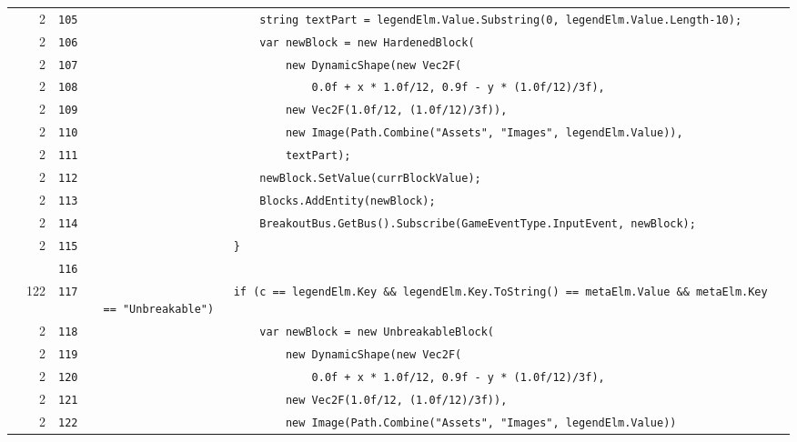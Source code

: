 \documentclass[a4paper,landscape,10pt]{article}
\begin{document}
\begin{longtable}[l]{lrrll}
\cellcolor{green} & 2 & \verb~105~ & & \verb~                        string textPart = legendElm.Value.Substring(0, legendElm.Value.Length-10);~\\
\cellcolor{green} & 2 & \verb~106~ & & \verb~                        var newBlock = new HardenedBlock(~\\
\cellcolor{green} & 2 & \verb~107~ & & \verb~                            new DynamicShape(new Vec2F(~\\
\cellcolor{green} & 2 & \verb~108~ & & \verb~                                0.0f + x * 1.0f/12, 0.9f - y * (1.0f/12)/3f),~\\
\cellcolor{green} & 2 & \verb~109~ & & \verb~                            new Vec2F(1.0f/12, (1.0f/12)/3f)),~\\
\cellcolor{green} & 2 & \verb~110~ & & \verb~                            new Image(Path.Combine("Assets", "Images", legendElm.Value)),~\\
\cellcolor{green} & 2 & \verb~111~ & & \verb~                            textPart);~\\
\cellcolor{green} & 2 & \verb~112~ & & \verb~                        newBlock.SetValue(currBlockValue);~\\
\cellcolor{green} & 2 & \verb~113~ & & \verb~                        Blocks.AddEntity(newBlock);~\\
\cellcolor{green} & 2 & \verb~114~ & & \verb~                        BreakoutBus.GetBus().Subscribe(GameEventType.InputEvent, newBlock);~\\
\cellcolor{green} & 2 & \verb~115~ & & \verb~                    }~\\
\cellcolor{gray} &  & \verb~116~ & & \verb~~\\
\cellcolor{green} & 122 & \verb~117~ & & \verb~                    if (c == legendElm.Key && legendElm.Key.ToString() == metaElm.Value && metaElm.Key == "Unbreakable")~\\
\cellcolor{green} & 2 & \verb~118~ & & \verb~                        var newBlock = new UnbreakableBlock(~\\
\cellcolor{green} & 2 & \verb~119~ & & \verb~                            new DynamicShape(new Vec2F(~\\
\cellcolor{green} & 2 & \verb~120~ & & \verb~                                0.0f + x * 1.0f/12, 0.9f - y * (1.0f/12)/3f),~\\
\cellcolor{green} & 2 & \verb~121~ & & \verb~                            new Vec2F(1.0f/12, (1.0f/12)/3f)),~\\
\cellcolor{green} & 2 & \verb~122~ & & \verb~                            new Image(Path.Combine("Assets", "Images", legendElm.Value))~\\

\end{longtable}
\end{document}

